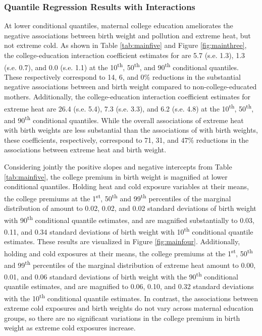 \hypertarget{quantile-regression-results-with-interactions}{%
\subsubsection{Quantile Regression Results with
Interactions}\label{quantile-regression-results-with-interactions}}

At lower conditional quantiles, maternal college education ameliorates the negative
associations between birth weight and pollution and extreme heat, but not
extreme cold. As shown in Table \ref{tab:mainfive} and Figure \ref{fig:mainthree}, the college-education
interaction coefficient estimates for \PARPMTEN are 5.7 (s.e. 1.3), 1.3
(s.e. 0.7), and 0.0 (s.e. 1.1) at the 10\textsuperscript{th},
50\textsuperscript{th}, and 90\textsuperscript{th} conditional
quantiles. These respectively correspond to 14, 6, and 0\%
reductions in the substantial negative associations between \PARPMTEN and birth
weight compared to non-college-educated mothers. Additionally, the
college-education interaction coefficient estimates for extreme heat are
26.4 (s.e. 5.4), 7.3 (s.e. 3.3), and 6.2 (s.e. 4.8) at the
10\textsuperscript{th}, 50\textsuperscript{th}, and
90\textsuperscript{th} conditional quantiles. While the overall associations of extreme heat with birth weights are less substantial than the associations of \PARPMTEN with birth weights, these coefficients, respectively,
correspond to  71, 31, and 47\% reductions in the associations between extreme heat and birth weight.

Considering jointly the positive slopes and negative intercepts from Table \ref{tab:mainfive}, the college
premium in birth weight is magnified at lower conditional quantiles.
Holding heat and cold exposure variables at their means, the college premiums at
the 1\textsuperscript{st}, 50\textsuperscript{th} and
99\textsuperscript{th} percentiles of the marginal distribution of \PARPMTEN
amount to 0.02, 0.02, and 0.02 standard deviations of birth weight with
90\textsuperscript{th} conditional quantile estimates, and are magnified
substantially to 0.03, 0.11, and 0.34 standard deviations of birth weight
with 10\textsuperscript{th} conditional quantile estimates. These
results are visualized in Figure \ref{fig:mainfour}. Additionally, holding \PARPMTEN and cold
exposures at their means, the college premiums at the
1\textsuperscript{st}, 50\textsuperscript{th} and 99\textsuperscript{th}
percentiles of the marginal distribution of extreme heat amount to 0.00,
0.01, and 0.06 standard deviations of birth weight with the
90\textsuperscript{th} conditional quantile estimates, and are magnified
to 0.06, 0.10, and 0.32 standard deviations with the
10\textsuperscript{th} conditional quantile estimates. In contrast, the associations between extreme cold exposures
and birth weights do not vary across maternal education groups, so there are no significant variations in the college premium in birth weight as extreme cold exposures increase.

